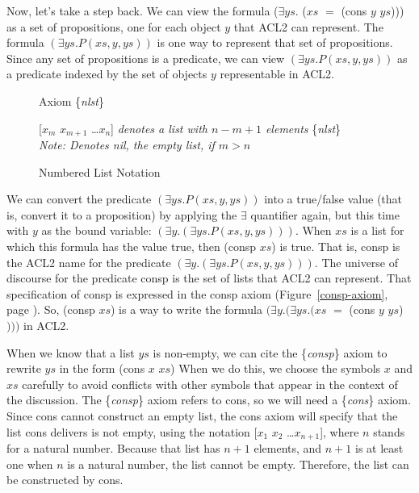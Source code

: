 Now, let's take a step back.
We can view the formula
($\exists ys.$ ($xs$ $=$ (cons $y$ $ys$)))
as a set of propositions,
one for each object $y$ that ACL2 can represent.
The formula
$(\exists ys.P(xs, y, ys))$ is one way to represent that
set of propositions.
Since any set of propositions is a predicate,
we can view $(\exists ys.P(xs, y, ys))$ as a predicate indexed
by the set of objects $y$ representable in ACL2.

\begin{figure}
\begin{center}
Axiom \{\emph{nlst}\}

[$x_{m}$  $x_{m+1}$ \dots $x_{n}$]  \emph{denotes a list with $n - m + 1$ elements} \{\emph{nlst}\} \\
\emph{Note: Denotes nil, the empty list, if $m > n$}
\end{center}
\caption{Numbered List Notation}
\label{numbered-list-interpretation}
\end{figure}

We can convert the predicate $(\exists ys.P(xs, y, ys))$
into a true/false value (that is, convert it to a proposition)
by applying the $\exists$ quantifier again,
but this time with $y$ as the bound variable:
$(\exists y.(\exists ys.P(xs, y, ys)))$.
When $xs$ is a list for which this formula has the value true,
then (consp $xs$) is true.
That is, consp is the ACL2 name for the predicate $(\exists y.(\exists ys.P(xs, y, ys)))$.
The universe of discourse for the predicate consp is the set of lists that ACL2 can represent.
That specification of consp is expressed in the consp axiom
(Figure~\ref{consp-axiom}, page \pageref{consp-axiom}).
So, (consp $xs$) is a way to write the formula
$(\exists y.(\exists ys.(xs$ $=$ (cons $y$ $ys$)$)))$ in ACL2.

When we know that a list $ys$ is non-empty,
we can cite the \{\emph{consp}\} axiom
to rewrite $ys$ in the form (cons $x$ $xs$)
When we do this, we choose the symbols $x$ and $xs$ carefully
to avoid conflicts with other symbols that appear in the context of the discussion.
The \{\emph{consp}\} axiom refers to cons, so we will need a \{\emph{cons}\} axiom.
Since cons cannot construct an empty list,
the cons axiom will specify that the list cons delivers is not empty,
using the notation [$x_1$ $x_2$ \dots $x_{n+1}$],
where $n$ stands for a natural number.
Because that list has $n+1$ elements, and $n+1$
is at least one when $n$ is a natural number,
the list cannot be empty.
Therefore, the list can be constructed by cons.

